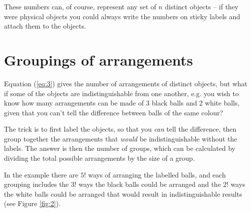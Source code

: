 \documentclass[a5paper]{article}
\begin{document}
These numbers can, of course, represent any set of $n$ distinct objects -- if
they were physical objects you could always write the numbers on sticky labels
and attach them to the objects.

\section{Groupings of arrangements}

Equation (\ref{eq:3}) gives the number of arrangements of distinct objects, but
what if some of the objects are indistinguishable from one another, e.g. you
wish to know how many arrangements can be made of 3 black balls and 2 white
balls, given that you can't tell the difference between balls of the same
colour?

The trick is to first label the objects, so that you \textit{can} tell the
difference, then group together the arrangements that \textit{would} be
indistinguishable without the labels. The answer is then the number of groups,
which can be calculated by dividing the total possible arrangements by the size
of a group.

In the example there are $5!$ ways of arranging the labelled balls, and each
grouping includes the $3!$ ways the black balls could be arranged and the $2!$
ways the white balls could be arranged that would result in indistinguishable
results (see Figure \ref{fig:2}).
\end{document}
